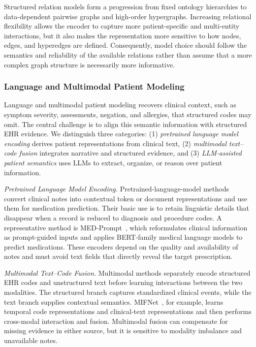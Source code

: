 \documentclass[manuscript,review]{acmart}
\begin{document}
Structured relation models form a progression from fixed ontology hierarchies to data-dependent pairwise graphs and high-order hypergraphs. Increasing relational flexibility allows the encoder to capture more patient-specific and multi-entity interactions, but it also makes the representation more sensitive to how nodes, edges, and hyperedges are defined. Consequently, model choice should follow the semantics and reliability of the available relations rather than assume that a more complex graph structure is necessarily more informative.

\subsubsection{Language and Multimodal Patient Modeling}

Language and multimodal patient modeling recovers clinical context, such as symptom severity, assessments, negation, and allergies, that structured codes may omit. The central challenge is to align this semantic information with structured EHR evidence. We distinguish three categories: (1) \textit{pretrained language model encoding} derives patient representations from clinical text, (2) \textit{multimodal text--code fusion} integrates narrative and structured evidence, and (3) \textit{LLM-assisted patient semantics} uses LLMs to extract, organize, or reason over patient information.

\textit{Pretrained Language Model Encoding.} Pretrained-language-model methods convert clinical notes into contextual token or document representations and use them for medication prediction. Their basic use is to retain linguistic details that disappear when a record is reduced to diagnosis and procedure codes. A representative method is MED-Prompt~\cite{ahmed2024medprompt}, which reformulates clinical information as prompt-guided inputs and applies BERT-family medical language models to predict medications. These encoders depend on the quality and availability of notes and must avoid text fields that directly reveal the target prescription.

\textit{Multimodal Text--Code Fusion.} Multimodal methods separately encode structured EHR codes and unstructured text before learning interactions between the two modalities. The structured branch captures standardized clinical events, while the text branch supplies contextual semantics. MIFNet~\cite{huoMIFNetMultimodalInteractive2024a}, for example, learns temporal code representations and clinical-text representations and then performs cross-modal interaction and fusion. Multimodal fusion can compensate for missing evidence in either source, but it is sensitive to modality imbalance and unavailable notes.
\end{document}

